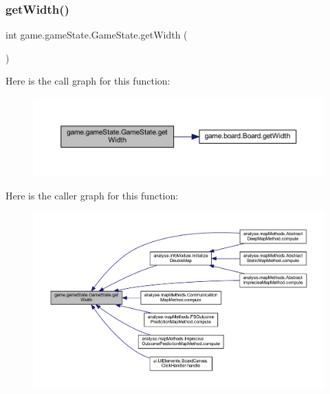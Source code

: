 \subsubsection{\texorpdfstring{get\+Width()}{getWidth()}}
{\footnotesize\ttfamily int game.\+game\+State.\+Game\+State.\+get\+Width (\begin{DoxyParamCaption}{ }\end{DoxyParamCaption})\hspace{0.3cm}{\ttfamily [inline]}}

Here is the call graph for this function\+:
\nopagebreak
\begin{figure}[H]
\begin{center}
\leavevmode
\includegraphics[width=350pt]{classgame_1_1game_state_1_1_game_state_ab7f97a46f9310d08bd3358755168262c_cgraph}
\end{center}
\end{figure}
Here is the caller graph for this function\+:
\nopagebreak
\begin{figure}[H]
\begin{center}
\leavevmode
\includegraphics[width=350pt]{classgame_1_1game_state_1_1_game_state_ab7f97a46f9310d08bd3358755168262c_icgraph}
\end{center}
\end{figure}
\mbox{\label{classgame_1_1game_state_1_1_game_state_af6886fabf0eb529d7bda218d46d45ae7}} 

